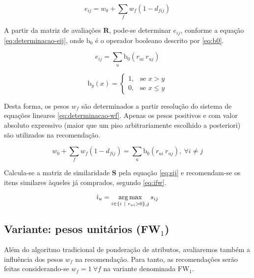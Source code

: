 \begin{equation}
\label{eq:regressao-linear} 
    e_{ij} = w_0 + \sum_{f}{w_{f} \left(1-d_{fij}\right)}
\end{equation} 

A partir da matriz de avaliações $\mathbf{R}$, pode-se determinar $e_{ij}$, conforme a equação \ref{eq:determinacao-eij}, onde $\mathrm{b_0}$ é o operador booleano descrito por \ref{eq:b0}.

\begin{equation}
\label{eq:determinacao-eij} 
    e_{ij} = \sum_{u}{\mathrm{b_0}\left(r_{ui} ~ r_{uj}\right)}
\end{equation} 

\begin{equation}
\label{eq:b0}
\mathrm{b}_y\left(x\right) = 
\begin{cases}
1, &\text{se }x>y \\
0, &\text{se }x\leq y
\end{cases} 
\end{equation}

Desta forma, os pesos $w_f$ são determinados a partir resolução do sistema de equações lineares \ref{eq:determinacao-wf}. Apenas os pesos positivos e com valor absoluto expressivo (maior que um piso arbitrariamente escolhido a posteriori) são utilizados na recomendação. 

\begin{equation}
\label{eq:determinacao-wf} 
    w_0 + \sum_{f}{w_{f}  \left(1-d_{fij}\right)} = \sum_{u}{\mathrm{b_0}\left(r_{ui} ~ r_{uj}\right)},~\forall i \neq j 
\end{equation} 

Calcula-se a matriz de similaridade $\mathbf{S}$ pela equação \ref{eq:sij} e recomendam-se os itens similares àqueles já comprados, segundo \ref{eq:ifw}.

\begin{equation}
\label{eq:ifw} 
    \hat{\imath}_u = \operatorname*{arg\,max}_{i \in \left\{i~|~r_{ui} > 0\right\}, j}{s_{ij}}
\end{equation} 

\subsection{Variante: pesos unitários (FW$_1$)} %
\label{sub:variante_pesos_unit_rios}

Além do algoritmo tradicional de ponderação de atributos, avaliaremos também a influência dos pesos $w_f$ na recomendação. Para tanto, as recomendações serão feitas considerando-se $w_f = 1~\forall f$ na variante denominada FW$_1$. 

